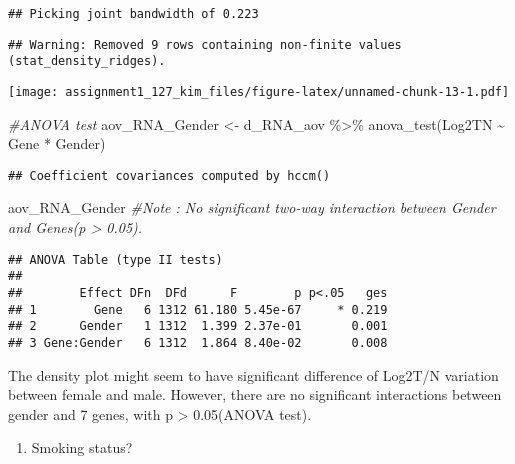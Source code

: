\documentclass[
]{article}
\newenvironment{Shaded}{\begin{snugshade}}{\end{snugshade}}
\newcommand{\CommentTok}[1]{\textcolor[rgb]{0.56,0.35,0.01}{\textit{#1}}}
\newcommand{\FunctionTok}[1]{\textcolor[rgb]{0.00,0.00,0.00}{#1}}
\newcommand{\NormalTok}[1]{#1}
\newcommand{\OtherTok}[1]{\textcolor[rgb]{0.56,0.35,0.01}{#1}}
\newcommand{\SpecialCharTok}[1]{\textcolor[rgb]{0.00,0.00,0.00}{#1}}
\providecommand{\tightlist}{%
  \setlength{\itemsep}{0pt}\setlength{\parskip}{0pt}}
\begin{document}
\begin{verbatim}
## Picking joint bandwidth of 0.223
\end{verbatim}

\begin{verbatim}
## Warning: Removed 9 rows containing non-finite values (stat_density_ridges).
\end{verbatim}

\texttt{[image: assignment1\_127\_kim\_files/figure-latex/unnamed-chunk-13-1.pdf]}

\begin{Shaded}
\begin{Highlighting}[]
\CommentTok{\#ANOVA test}
\NormalTok{aov\_RNA\_Gender }\OtherTok{\textless{}{-}}\NormalTok{ d\_RNA\_aov }\SpecialCharTok{\%\textgreater{}\%} \FunctionTok{anova\_test}\NormalTok{(Log2TN }\SpecialCharTok{\textasciitilde{}}\NormalTok{ Gene }\SpecialCharTok{*}\NormalTok{ Gender)}
\end{Highlighting}
\end{Shaded}

\begin{verbatim}
## Coefficient covariances computed by hccm()
\end{verbatim}

\begin{Shaded}
\begin{Highlighting}[]
\NormalTok{aov\_RNA\_Gender }\CommentTok{\#Note : No significant two{-}way interaction between Gender and Genes(p \textgreater{} 0.05).}
\end{Highlighting}
\end{Shaded}

\begin{verbatim}
## ANOVA Table (type II tests)
## 
##        Effect DFn  DFd      F        p p<.05   ges
## 1        Gene   6 1312 61.180 5.45e-67     * 0.219
## 2      Gender   1 1312  1.399 2.37e-01       0.001
## 3 Gene:Gender   6 1312  1.864 8.40e-02       0.008
\end{verbatim}

The density plot might seem to have significant difference of Log2T/N
variation between female and male. However, there are no significant
interactions between gender and 7 genes, with p \textgreater{}
0.05(ANOVA test).

\begin{enumerate}
\def\labelenumi{\arabic{enumi})}
\setcounter{enumi}{1}
\tightlist
\item
  Smoking status?
\end{enumerate}
\end{document}
